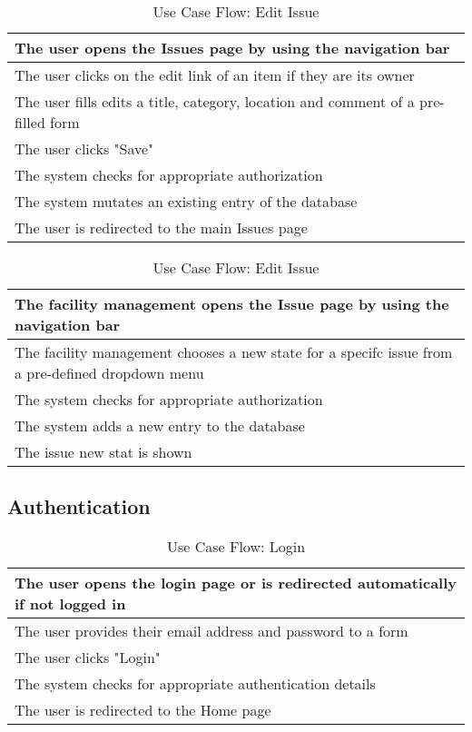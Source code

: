   \begin{table}[H]
    \begin{tabularx}{\linewidth}{|X|}
      \hline
       The user opens the Issues page by using the navigation bar \\
       \hline
       The user clicks on the edit link of an item if they are its owner \\
       \hline
       The user fills edits a title, category, location and comment of a pre-filled form  \\
       \hline
       The user clicks "Save" \\
       \hline
       The system checks for appropriate authorization \\
       \hline
       The system mutates an existing entry of the database \\
       \hline
       The user is redirected to the main Issues page \\
       \hline 
    \end{tabularx}
    \caption{Use Case Flow: Edit Issue}
  \end{table}

  \begin{table}[H]
    \begin{tabularx}{\linewidth}{|X|}
      \hline
       The facility management opens the Issue page by using the navigation bar \\
       \hline
       The facility management chooses a new state for a specifc issue from a pre-defined dropdown menu \\
       \hline
       The system checks for appropriate authorization \\
       \hline
       The system adds a new entry to the database \\
       \hline
       The issue new stat is shown \\
       \hline 
    \end{tabularx}
    \caption{Use Case Flow: Edit Issue}
  \end{table}

\subsection{Authentication}
\begin{table}[H]
  \begin{tabularx}{\linewidth}{|X|}
    \hline
     The user opens the login page or is redirected automatically if not logged in \\
     \hline
     The user provides their email address and password to a form \\
     \hline
     The user clicks "Login" \\
     \hline
     The system checks for appropriate authentication details \\
     \hline
     The user is redirected to the Home page \\
     \hline 
  \end{tabularx}
  \caption{Use Case Flow: Login}
\end{table}

